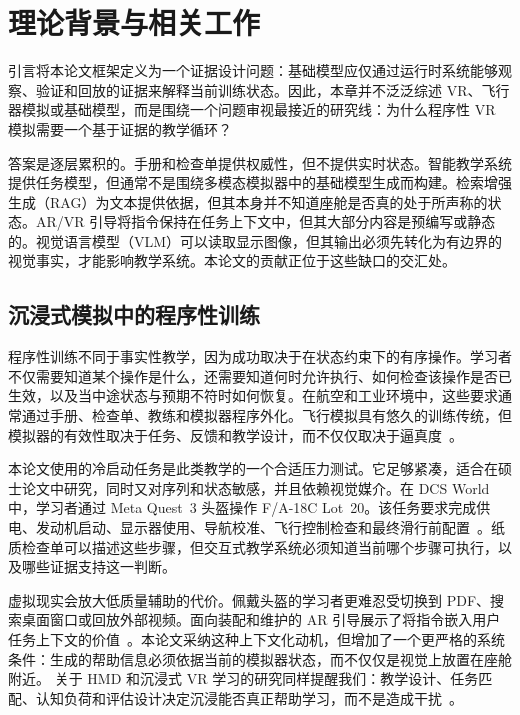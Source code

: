 %
\chapter{理论背景与相关工作}\label{ch:background}

引言将本论文框架定义为一个证据设计问题：基础模型应仅通过运行时系统能够观察、验证和回放的证据来解释当前训练状态。因此，本章并不泛泛综述 VR、飞行器模拟或基础模型，而是围绕一个问题审视最接近的研究线：为什么程序性 VR 模拟需要一个基于证据的教学循环？

答案是逐层累积的。手册和检查单提供权威性，但不提供实时状态。智能教学系统提供任务模型，但通常不是围绕多模态模拟器中的基础模型生成而构建。检索增强生成（RAG）为文本提供依据，但其本身并不知道座舱是否真的处于所声称的状态。AR/VR 引导将指令保持在任务上下文中，但其大部分内容是预编写或静态的。视觉语言模型（VLM）可以读取显示图像，但其输出必须先转化为有边界的视觉事实，才能影响教学系统。本论文的贡献正位于这些缺口的交汇处。

\section{沉浸式模拟中的程序性训练}\label{sec:bg-procedural}

程序性训练不同于事实性教学，因为成功取决于在状态约束下的有序操作。学习者不仅需要知道某个操作是什么，还需要知道何时允许执行、如何检查该操作是否已生效，以及当中途状态与预期不符时如何恢复。在航空和工业环境中，这些要求通常通过手册、检查单、教练和模拟器程序外化。飞行模拟具有悠久的训练传统，但模拟器的有效性取决于任务、反馈和教学设计，而不仅仅取决于逼真度~\citep{hays1992flight}。

本论文使用的冷启动任务是此类教学的一个合适压力测试。它足够紧凑，适合在硕士论文中研究，同时又对序列和状态敏感，并且依赖视觉媒介。在 DCS World 中，学习者通过 Meta Quest~3 头盔操作 F/A-18C Lot~20。该任务要求完成供电、发动机启动、显示器使用、导航校准、飞行控制检查和最终滑行前配置~\citep{dcsworld,eagledynamics2023hornetguide}。纸质检查单可以描述这些步骤，但交互式教学系统必须知道当前哪个步骤可执行，以及哪些证据支持这一判断。

虚拟现实会放大低质量辅助的代价。佩戴头盔的学习者更难忍受切换到 PDF、搜索桌面窗口或回放外部视频。面向装配和维护的 AR 引导展示了将指令嵌入用户任务上下文的价值~\citep{tang2003arassembly,henderson2011ar,palmarini2018ar}。本论文采纳这种上下文化动机，但增加了一个更严格的系统条件：生成的帮助信息必须依据当前的模拟器状态，而不仅仅是视觉上放置在座舱附近。
关于 HMD 和沉浸式 VR 学习的研究同样提醒我们：教学设计、任务匹配、认知负荷和评估设计决定沉浸能否真正帮助学习，而不是造成干扰~\citep{jensen2018vrhmd,radianti2020ivr,makransky2021camil}。

